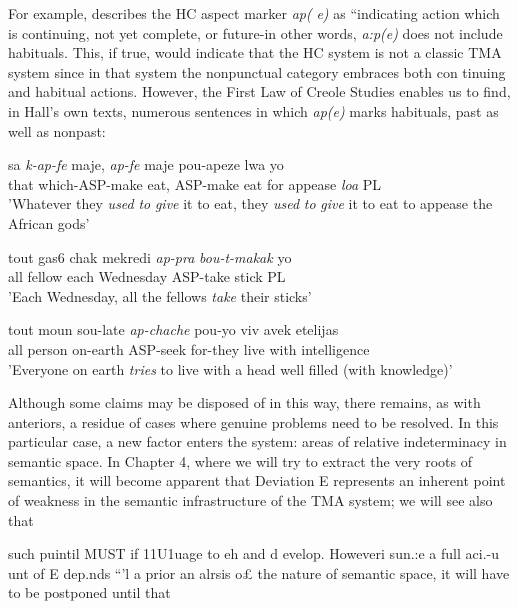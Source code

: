 For example, \citet[31]{Hall1953} describes the HC aspect marker \textit{ap(} \textit{e}\textit{)} as ``indicating action which is continuing, not yet complete, or future{\textquotedbl}{}-in other words, \textit{a:p}\textit{(}\textit{e}\textit{) }does not include habituals. This, if true, would indicate that the HC system is not a classic TMA system since in that system the nonpunctual category embraces both con%
tinuing and habitual actions. However, the First Law of Creole Studies enables us to find, in Hall's own texts, numerous sentences in which \textit{ap(e)} marks habituals, past as well as nonpast:

\ea\label{ex:122}
\gll sa \textit{k-ap-fe} maje, \textit{ap-fe} maje pou-apeze lwa yo\\
that which-ASP-make eat, ASP-make eat for appease \textit{loa} PL\\
\glt 'Whatever they \textit{used} \textit{to} \textit{give} it to eat, they \textit{used} \textit{to} \textit{give} it to eat to appease the African gods'
\z





\ea\label{ex:123}
 \gll tout gas6 chak mekredi \textit{ap-pra} \textit{bou-t-makak} yo\\
all fellow each Wednesday ASP-take stick PL\\
\glt 'Each Wednesday, all the fellows \textit{take} their sticks'
\z



\ea\label{ex:124}
\gll tout moun sou-late \textit{ap-chache} pou-yo viv avek etelijas\\
all person on-earth ASP-seek for-they live with intelligence\\
\glt  'Everyone on earth \textit{tries }to live with a head well filled (with knowledge)'
\z


Although some claims may be disposed of in this way, there remains, as with anteriors, a residue of cases where genuine problems need to be resolved. In this particular case, a new factor enters the system: areas of relative indeterminacy in semantic space. In Chapter 4, where we will try to extract the very roots of semantics, it will become apparent that Deviation E represents an inherent point of weakness in the semantic infrastructure of the TMA system; we will see also that

such puintil MUST if 11U1uage to eh and d evelop. Howeveri sun.:e a full aci.-u unt of E dep.nds ``'l a prior an alrsis o£ the nature of semantic space, it will have to be postponed until that

